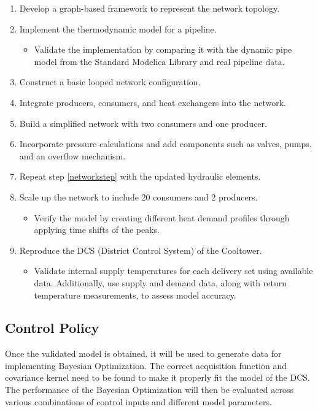 \begin{enumerate}
\item Develop a graph-based framework to represent the network topology.
\item Implement the thermodynamic model for a pipeline.
\begin{itemize}
\item Validate the implementation by comparing it with the dynamic pipe model from the Standard Modelica Library and real pipeline data.
\end{itemize}
\item Construct a basic looped network configuration.
\item Integrate producers, consumers, and heat exchangers into the network.
\item Build a simplified network with two consumers and one producer. \label{networkstep}
\item Incorporate pressure calculations and add components such as valves, pumps, and an overflow mechanism.
\item Repeat step \ref{networkstep} with the updated hydraulic elements.
\item Scale up the network to include 20 consumers and 2 producers.
\begin{itemize}
    \item Verify the model by creating different heat demand profiles through applying time shifts of the peaks. 
\end{itemize}
\item Reproduce the DCS (District Control System) of the Cooltower.
\begin{itemize}
\item Validate internal supply temperatures for each delivery set using available data. Additionally, use supply and demand data, along with return temperature measurements, to assess model accuracy.
\end{itemize}
\end{enumerate}

\subsection{Control Policy}
Once the validated model is obtained, it will be used to generate data for implementing Bayesian Optimization. The correct acquisition function and covariance kernel need to be found to make it properly fit the model of the DCS. The performance of the Bayesian Optimization will then be evaluated across various combinations of control inputs and different model parameters. 


